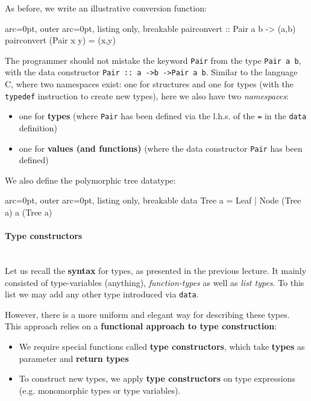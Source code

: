 As before, we write an illustrative conversion function:

\begin{tcblisting}{ arc=0pt, outer arc=0pt, listing only, breakable}
pairconvert :: Pair a b -> (a,b)
pairconvert (Pair x y) = (x,y)

\end{tcblisting}


The programmer should not mistake the keyword \texttt{Pair} from the type \texttt{Pair a b}, with the data constructor \texttt{Pair :: a -\textgreater  b -\textgreater  Pair a b}. Similar to the language C, where two namespaces exist: one for structures and one for types (with the \texttt{typedef} instruction to create new types), here we also have two \textit{namespaces}:
\begin{itemize}
	\item  one for \textbf{types} (where \texttt{Pair} has been defined via the l.h.s. of the \texttt{=} in the \texttt{data} definition)
	\item  one for \textbf{values (and functions)} (where the data constructor \texttt{Pair} has been defined)
\end{itemize}

We also define the polymorphic tree datatype:


\begin{tcblisting}{ arc=0pt, outer arc=0pt, listing only, breakable}
data Tree a = Leaf | Node (Tree a) a (Tree a)

\end{tcblisting}


\paragraph{ Type constructors }\hfill\\

Let us recall the \textbf{syntax} for types, as presented in the previous lecture. It mainly consisted of type-variables (anything), \textit{function-types} as well as \textit{list types}. To this list we may add any other type introduced via \texttt{data}.

However, there is a more uniform and elegant way for describing these types. This approach relies on a \textbf{functional approach to type construction}:
\begin{itemize}
	\item  We require special functions called \textbf{type constructors}, which take \textbf{types} as parameter and \textbf{return types} 
	\item  To construct new types, we apply \textbf{type constructors} on type expressions (e.g. monomorphic types or type variables).
\end{itemize}

